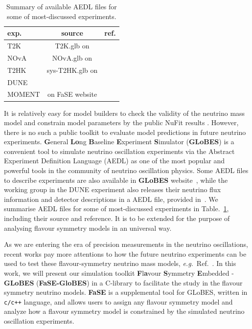 \documentclass[aps,prd,nofootinbib,preprint]{revtex4}
\begin{document}
\begin{table}[h!]
\caption{\label{tab:exp}Summary of available AEDL files for some of most-discussed experiments.}
\centering
\begin{tabular}{l|c|r}
exp.   & source & ref. \\\hline\hline
T2K    &     T2K.glb on \cite{GLoBES}  &    \cite{Huber:2002mx}  \\
NOvA   &     NOvA.glb on \cite{GLoBES}   &   \cite{Ambats:2004js}   \\
T2HK   & sys-T2HK.glb on \cite{GLoBES}  &   \cite{Huber:2007xx}   \\
DUNE   &    \cite{Alion:2016uaj}    &  \cite{Alion:2016uaj}    \\
MOMENT &   on FaSE website    &     \cite{Cao:2014bea}
\end{tabular}
\end{table}

 
It is relatively easy for model builders to check the validity of the neutrino mass model and constrain model parameters by the public NuFit results \cite{Esteban:2018azc}. However, there is no such a public toolkit to evaluate model predictions in future neutrino experiments. \textbf{G}eneral \textbf{Lo}ng \textbf{B}aseline \textbf{E}xperiment \textbf{S}imulator (\textbf{GLoBES}) \cite{Huber:2004ka,Huber:2007ji} is a convenient tool to simulate neutrino oscillation experiments via the Abstract Experiment Definition Language (AEDL) as one of the most popular and powerful tools in the community of neutrino oscillation physics. Some AEDL files to describe experiments are also available in \textbf{GLoBES} website~\cite{GLoBES}, while the working group in the DUNE experiment also releases their neutrino flux information and detector descriptions in a AEDL file, provided in~\cite{Alion:2016uaj}. {\color{blue}We summarise AEDL files for some of most-discussed experiments in Table.~\ref{tab:exp}, including their source and reference.} It is to be extended for the purpose of analysing flavour symmetry models in an universal way. 




As we are entering the era of precision measurements in the neutrino oscillations, recent works pay more attentions to how the future neutrino experiments can be used to test these flavour-symmetry neutrino mass models, \textit{e.g.}~Ref.~\cite{Ballett:2016yod,Chatterjee:2017xkb, Ding:2019zhn, Tang:2019edw, Blennow:2020snb}. In this work, we will present our simulation toolkit \textbf{F}l\textbf{a}vour \textbf{S}ymmetry \textbf{E}mbedded - \textbf{GLoBES} (\textbf{FaSE-GloBES}) in a C-library to facilitate the study in the flavour symmetry neutrino models. \textbf{FaSE} is a supplemental tool for GLoBES, written in \texttt{c/c++} language, and allows users to assign any flavour symmetry model and analyze how a flavour symmetry model is constrained by the simulated neutrino oscillation experiments.
\end{document}
